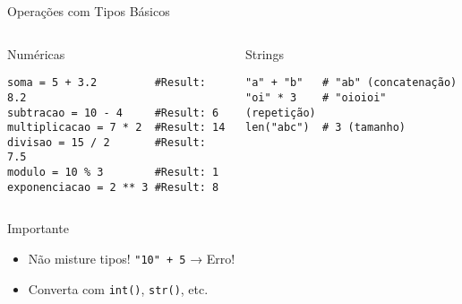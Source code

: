 \begin{frame}[fragile]{Operações com Tipos Básicos}
    \begin{columns}[T]

        \begin{block}{Numéricas}
            \begin{verbatim}
soma = 5 + 3.2         #Result: 8.2
subtracao = 10 - 4     #Result: 6
multiplicacao = 7 * 2  #Result: 14
divisao = 15 / 2       #Result: 7.5
modulo = 10 % 3        #Result: 1
exponenciacao = 2 ** 3 #Result: 8
\end{verbatim}
        \end{block}

        \begin{block}{Strings}
            \begin{verbatim}
"a" + "b"   # "ab" (concatenação)
"oi" * 3    # "oioioi" (repetição)
len("abc")  # 3 (tamanho)
\end{verbatim}
        \end{block}

    \end{columns}

    \begin{exampleblock}{Importante}
        \begin{itemize}
            \item Não misture tipos! \texttt{"10" + 5} → Erro!
            \item Converta com \texttt{int()}, \texttt{str()}, etc.
        \end{itemize}
    \end{exampleblock}
\end{frame}

